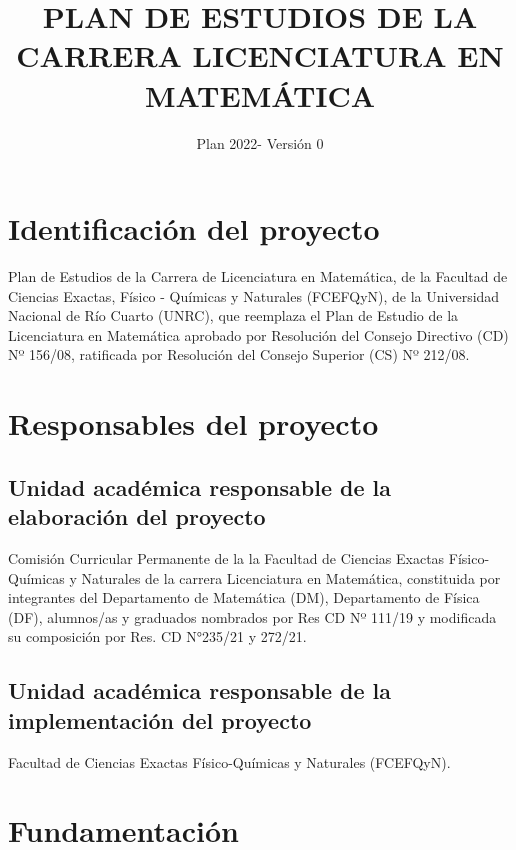 \documentclass[a4paper, 12pt]{article}
\begin{document}
\title{PLAN DE ESTUDIOS DE LA CARRERA LICENCIATURA EN MATEMÁTICA}
\author{Plan 2022- Versión 0}
\date{}
 \maketitle

 \newpage



\tableofcontents

\newpage


\section{Identificación del proyecto}  

Plan de Estudios de la 
Carrera de Licenciatura en Matemática, de la Facultad de Ciencias Exactas, 
Físico - Químicas y Naturales (FCEFQyN), de la Universidad Nacional de Río Cuarto (UNRC), que  reemplaza el Plan de Estudio de la Licenciatura en Matemática aprobado por Resolución del Consejo Directivo (CD) Nº 156/08, 
ratificada por Resolución del Consejo Superior (CS) Nº 212/08.


\section{Responsables del proyecto}

\subsection{Unidad académica responsable de la elaboración del proyecto}

Comisión Curricular Permanente de la 
la Facultad de Ciencias Exactas Físico-Químicas y Naturales de la carrera Licenciatura en Matemática, constituida por integrantes del Departamento de Matemática (DM), Departamento de Física (DF), alumnos/as y graduados nombrados por Res CD Nº  111/19 y modificada su composición por Res. CD N°235/21 y 272/21.  


\subsection{Unidad académica responsable de la implementación del proyecto}

Facultad de Ciencias Exactas Físico-Químicas y Naturales (FCEFQyN). 



\section{Fundamentación}
\end{document}
